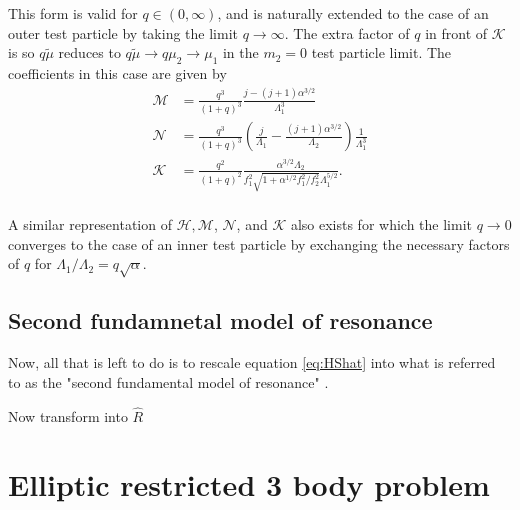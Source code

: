 \documentclass[usenatbib]{mnras}
\newcommand{\note}[1]{{\color{red} \large #1 }}
\begin{document}
\noindent This form is valid for \(q\in (0,\infty)\), and is
naturally extended to the case of an outer test particle by taking the
limit \(q\to\infty\).  The extra factor of \(q\) in front of \(\mathcal K\)
is so \(q\tilde\mu\) reduces to \(q\tilde\mu\to q\mu_2 \to \mu_1\) in the
\(m_2=0\) test particle limit.  The coefficients in this case are given
by
\begin{align}
  \mathcal M
  &= \frac{q^3}{(1+q)^3}\frac{j-(j+1)\alpha^{3/2}}{\Lambda_1^3}\\
  \mathcal N
  &= \frac{q^3}{(1+q)^3}\left(
    \frac{j}{\Lambda_1} - \frac{(j+1)\alpha^{3/2}}{\Lambda_2}
    \right)\frac{1}{\Lambda_1^3}\\
  \mathcal K
  &= \frac{q^2}{(1+q)^2}
    \frac{\alpha^{3/2}\Lambda_2}{f_1^2\sqrt{1+\alpha^{1/2}f_1^2/f_2^2}\Lambda_1^{5/2}}.\\
\end{align}

A similar representation of \(\mathcal H, \mathcal M\), \(\mathcal N\),
and \(\mathcal{K}\) also exists for which the limit \(q\to 0\) converges
to the case of an inner test particle by exchanging the necessary
factors of \(q\) for \(\Lambda_1/\Lambda_2 = q\sqrt\alpha\).


\subsection{Second fundamnetal model of resonance}
\label{sec:orgba27ed2}
Now, all that is left to do is to rescale equation \eqref{eq:HShat}
into what is referred to as
the "second fundamental model of resonance" \citep{henrard_second_1983}.



\note{
Now transform into $\hat R$
}


\section{Elliptic restricted 3 body problem}
\label{sec:org33f8d64}

\twocolumn


\end{document}
